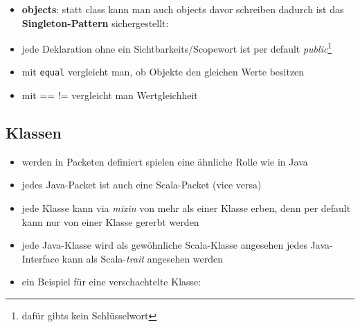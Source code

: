 \begin{itemize}
  
  \item \textbf{objects}: statt class kann man auch objects davor schreiben
  \und dadurch ist das \textbf{Singleton-Pattern} sichergestellt:
  
  
  
  \item jede Deklaration ohne ein Sichtbarkeits/Scopewort ist per default
  \textit{public}\footnote{dafür gibts kein Schlüsselwort}
  \item mit \texttt{equal} vergleicht man, ob Objekte den gleichen
  Werte besitzen
  \item mit == \und != vergleicht man Wertgleichheit

\end{itemize}


\subsection{Klassen}
\begin{itemize}
  \item werden in Packeten definiert \und spielen eine ähnliche Rolle wie
  in Java
  \item jedes Java-Packet ist auch eine Scala-Packet (vice versa)
  \item jede Klasse kann via \textit{mixin} von mehr als einer Klasse
  erben, denn per default kann nur von einer Klasse gererbt werden
  \item jede Java-Klasse wird als gewöhnliche Scala-Klasse angesehen \und 
  jedes Java-Interface kann als Scala-\textit{trait} angesehen werden
  \item ein Beispiel für eine verschachtelte Klasse:
  
  
\end{itemize}


